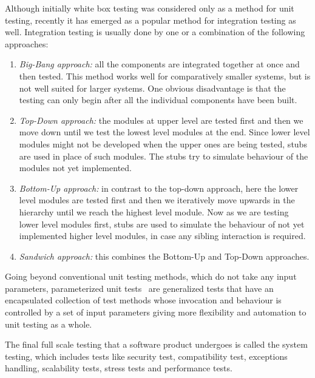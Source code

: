 Although initially white box testing was considered only as a method for unit testing, recently it has emerged as a popular method for integration testing as well. Integration testing is usually done by one or a combination of the following approaches: 
\begin{enumerate}[\IEEEsetlabelwidth{Z}]
\item \textit{Big-Bang approach:} all the components are integrated together at once and then tested. This method works well for comparatively smaller systems, but is not well suited for larger systems. One obvious disadvantage is that the testing can only begin after all the individual components have been built.
\item \textit{Top-Down approach:} the modules at upper level are tested first and then we move down until we test the lowest level modules at the end. Since lower level modules might not be developed when the upper ones are being tested, stubs are used in place of such modules. The stubs try to simulate behaviour of the modules not yet implemented.
\item \textit{Bottom-Up approach:} in contrast to the top-down approach, here the lower level modules are tested first and then we iteratively move upwards in the hierarchy until we reach the highest level module. Now as we are testing lower level modules first, stubs are used to simulate the behaviour of not yet implemented higher level modules, in case any sibling interaction is required.
\item \textit{Sandwich approach:} this combines the Bottom-Up and Top-Down approaches.
\end{enumerate}

Going beyond conventional unit testing methods, which do not take any input parameters, parameterized unit tests~\cite{tillmann2010parameterized} are generalized tests that have an encapsulated collection of test methods whose invocation and behaviour is controlled by a set of input parameters giving more flexibility and automation to unit testing as a whole.

The final full scale testing that a software product undergoes is called the system testing, which includes tests like security test, compatibility test, exceptions handling, scalability tests, stress tests and performance tests.


